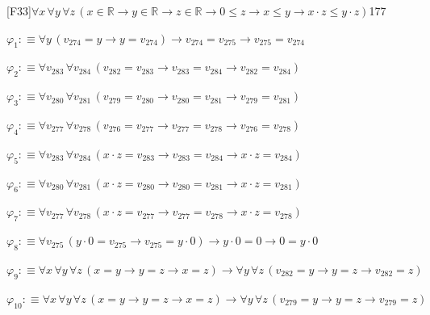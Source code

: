 \begin{fullproof}{[F33]}{$\forall x\,\forall y\,\forall z\,(x \in \mathbb{R} \to y \in \mathbb{R} \to z \in \mathbb{R} \to 0 \leq z \to x \leq y \to x \cdot z \leq y \cdot z)$}{177}
\begin{ptree}
\noLine
{}
\noLine
{}
\noLine
{}
\noLine
{}
\end{ptree}
\begin{abbrevlist}
\item $\varphi_{1} :\equiv \forall y\,(v_{274} = y \to y = v_{274}) \to v_{274} = v_{275} \to v_{275} = v_{274}$
\item $\varphi_{2} :\equiv \forall v_{283}\,\forall v_{284}\,(v_{282} = v_{283} \to v_{283} = v_{284} \to v_{282} = v_{284})$
\item $\varphi_{3} :\equiv \forall v_{280}\,\forall v_{281}\,(v_{279} = v_{280} \to v_{280} = v_{281} \to v_{279} = v_{281})$
\item $\varphi_{4} :\equiv \forall v_{277}\,\forall v_{278}\,(v_{276} = v_{277} \to v_{277} = v_{278} \to v_{276} = v_{278})$
\item $\varphi_{5} :\equiv \forall v_{283}\,\forall v_{284}\,(x \cdot z = v_{283} \to v_{283} = v_{284} \to x \cdot z = v_{284})$
\item $\varphi_{6} :\equiv \forall v_{280}\,\forall v_{281}\,(x \cdot z = v_{280} \to v_{280} = v_{281} \to x \cdot z = v_{281})$
\item $\varphi_{7} :\equiv \forall v_{277}\,\forall v_{278}\,(x \cdot z = v_{277} \to v_{277} = v_{278} \to x \cdot z = v_{278})$
\item $\varphi_{8} :\equiv \forall v_{275}\,(y \cdot 0 = v_{275} \to v_{275} = y \cdot 0) \to y \cdot 0 = 0 \to 0 = y \cdot 0$
\item $\varphi_{9} :\equiv \forall x\,\forall y\,\forall z\,(x = y \to y = z \to x = z) \to \forall y\,\forall z\,(v_{282} = y \to y = z \to v_{282} = z)$
\item $\varphi_{10} :\equiv \forall x\,\forall y\,\forall z\,(x = y \to y = z \to x = z) \to \forall y\,\forall z\,(v_{279} = y \to y = z \to v_{279} = z)$

\end{abbrevlist}
\end{fullproof}
